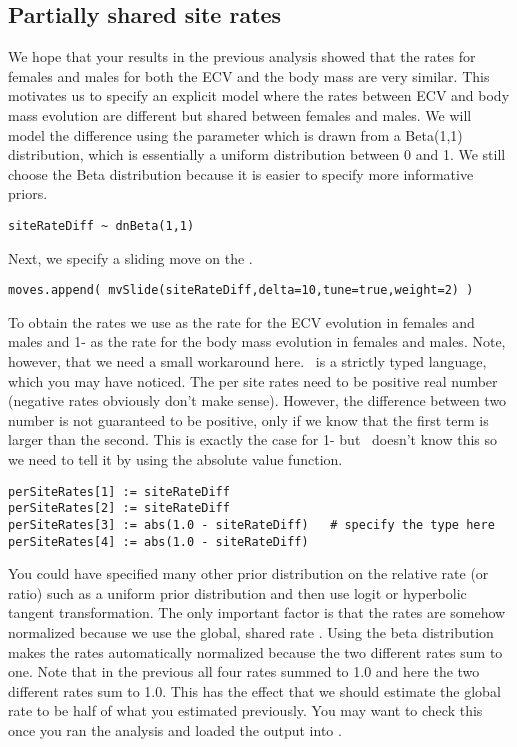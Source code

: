 \vspace{5cm}


\subsection{Partially shared site rates}
We hope that your results in the previous analysis showed that the rates for females and males for both the ECV and the body mass are very similar.
This motivates us to specify an explicit model where the rates between ECV and body mass evolution are different but shared between females and males.
We will model the difference using the  parameter which is drawn from a Beta(1,1) distribution, which is essentially a uniform distribution between 0 and 1.
We still choose the Beta distribution because it is easier to specify more informative priors.
{\tt \small \begin{snugshade*}
\begin{lstlisting}
siteRateDiff ~ dnBeta(1,1)
\end{lstlisting}
\end{snugshade*}}
Next, we specify a sliding move on the .
{\tt \small \begin{snugshade*}
\begin{lstlisting}
moves.append( mvSlide(siteRateDiff,delta=10,tune=true,weight=2) )
\end{lstlisting}
\end{snugshade*}}
To obtain the rates we use  as the rate for the ECV evolution in females and males and 1- as the rate for the body mass evolution in females and males.
Note, however, that we need a small workaround here. \Rev~is a strictly typed language, which you may have noticed. The per site rates need to be positive real number (negative rates obviously don't make sense). However, the difference between two number is not guaranteed to be positive, only if we know that the first term is larger than the second. This is exactly the case for 1- but \RevBayes~doesn't know this so we need to tell it by using the absolute value  function.
{\tt \small \begin{snugshade*}
\begin{lstlisting}
perSiteRates[1] := siteRateDiff
perSiteRates[2] := siteRateDiff
perSiteRates[3] := abs(1.0 - siteRateDiff)   # specify the type here
perSiteRates[4] := abs(1.0 - siteRateDiff)
\end{lstlisting}
\end{snugshade*}}
You could have specified many other prior distribution on the relative rate (or ratio) such as a uniform prior distribution and then use logit or hyperbolic tangent transformation.
The only important factor is that the rates are somehow normalized because we use the global, shared rate .
Using the beta distribution makes the rates automatically normalized because the two different rates sum to one. Note that in the previous all four rates summed to 1.0 and here the two different rates sum to 1.0. This has the effect that we should estimate the global rate  to be half of what you estimated previously. You may want to check this once you ran the analysis and loaded the output into \Tracer. 


